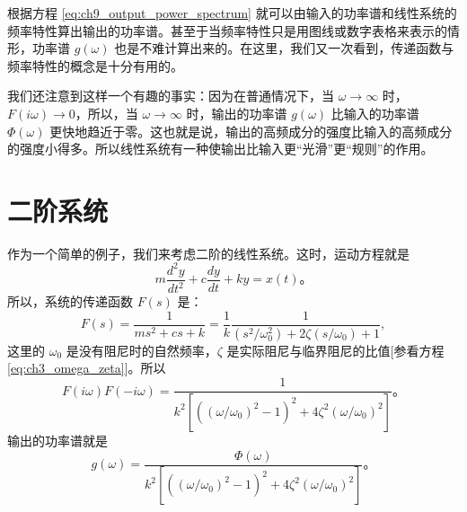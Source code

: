 根据方程 \eqref{eq:ch9_output_power_spectrum} 就可以由输入的功率谱和线性系统的频率特性算出输出的功率谱。甚至于当频率特性只是用图线或数字表格来表示的情形，功率谱 $ g(\omega) $ 也是不难计算出来的。在这里，我们又一次看到，传递函数与频率特性的概念是十分有用的。

我们还注意到这样一个有趣的事实：因为在普通情况下，当 $ \omega \to \infty $ 时，$ F(i\omega) \to 0 $，所以，当 $ \omega \to \infty $ 时，输出的功率谱 $ g(\omega) $ 比输入的功率谱 $ \Phi(\omega) $ 更快地趋近于零。这也就是说，输出的高频成分的强度比输入的高频成分的强度小得多。所以线性系统有一种使输出比输入更“光滑”更“规则”的作用。

\section{二阶系统}\label{chapter9_section_9}

作为一个简单的例子，我们来考虑二阶的线性系统。这时，运动方程就是  
\begin{equation}\label{eq:ch9_second_order}
m \frac{d^2 y}{dt^2} + c \frac{dy}{dt} + ky = x(t)。 
\end{equation}
所以，系统的传递函数 $ F(s) $ 是：  
\begin{equation*}
F(s) = \frac{1}{ms^2 + cs + k} = \frac{1}{k} \frac{1}{(s^2/\omega_0^2) + 2\zeta (s/\omega_0) + 1},
\end{equation*}
这里的 $ \omega_0 $ 是没有阻尼时的自然频率，$ \zeta $ 是实际阻尼与临界阻尼的比值[参看方程\eqref{eq:ch3_omega_zeta}]。所以  
\begin{equation*}
F(i\omega)F(-i\omega) = \frac{1}{k^2\left[\left((\omega/\omega_0)^2 - 1\right)^2 + 4\zeta^2 (\omega/\omega_0)^2\right]}。
\end{equation*}
输出的功率谱就是  
\begin{equation}\label{eq:ch9_output_spectrum_second_order}
g(\omega) = \frac{\Phi(\omega)}{k^2\left[\left((\omega/\omega_0)^2 - 1\right)^2 + 4\zeta^2 (\omega/\omega_0)^2\right]}。
\end{equation}


